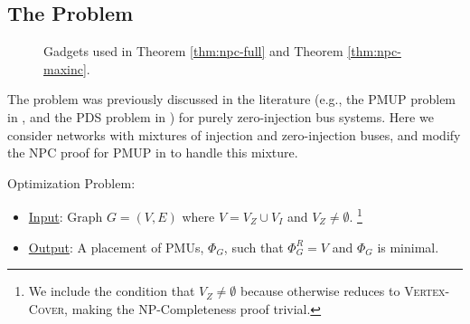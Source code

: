 \subsection{The \full Problem}
\label{subsec:full}


\begin{figure}[t]
	\caption{Gadgets used in  Theorem \ref{thm:npc-full} and Theorem \ref{thm:npc-maxinc}.}
  \label{fig:maxinc}
\end{figure}



The \full problem was previously discussed in the literature (e.g., the PMUP problem in \cite{Brueni05}, and the PDS problem in \cite{Haynes02}) for purely zero-injection bus systems. Here we consider networks with mixtures of injection and zero-injection buses, and modify the NPC proof for PMUP in \cite{Brueni05} to handle this mixture.

\full Optimization Problem:
\begin{itemize}
	\item \underline{Input}: Graph $G=(V,E)$ where $V=V_Z \cup V_I$ and $V_Z \neq \emptyset$.
	{\footnote {\small We include the condition that $V_Z \neq \emptyset$ because otherwise \full reduces to \textsc{Vertex-Cover}, making the NP-Completeness
	proof trivial.}}

	\item \underline{Output}: A placement of PMUs, $\Phi_G$, such that $\Phi^R_G=V$ and $\Phi_G$ is minimal.
\end{itemize}

